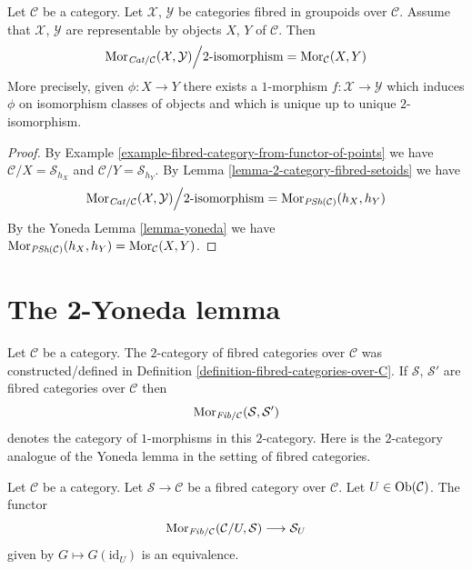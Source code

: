 \begin{lemma}
\label{lemma-morphisms-representable-fibred-categories}
Let $\mathcal{C}$ be a category.
Let $\mathcal{X}$, $\mathcal{Y}$ be categories fibred in groupoids
over $\mathcal{C}$. Assume that $\mathcal{X}$, $\mathcal{Y}$
are representable by objects $X$, $Y$ of $\mathcal{C}$.
Then
$$
\mathop{\mathrm{Mor}}\nolimits_{\textit{Cat}/\mathcal{C}}(\mathcal{X}, \mathcal{Y})
\Big/
2\text{-isomorphism}
=
\mathop{\mathrm{Mor}}\nolimits_\mathcal{C}(X, Y)
$$
More precisely, given $\phi : X \to Y$ there exists a
$1$-morphism $f : \mathcal{X} \to \mathcal{Y}$ which induces
$\phi$ on isomorphism classes of objects and
which is unique up to unique $2$-isomorphism.
\end{lemma}

\begin{proof}
By
Example \ref{example-fibred-category-from-functor-of-points}
we have $\mathcal{C}/X = \mathcal{S}_{h_X}$ and
$\mathcal{C}/Y = \mathcal{S}_{h_Y}$. By
Lemma \ref{lemma-2-category-fibred-setoids}
we have
$$
\mathop{\mathrm{Mor}}\nolimits_{\textit{Cat}/\mathcal{C}}(\mathcal{X}, \mathcal{Y})
\Big/
2\text{-isomorphism}
=
\mathop{\mathrm{Mor}}\nolimits_{\textit{PSh}(\mathcal{C})}(h_X, h_Y)
$$
By the Yoneda
Lemma \ref{lemma-yoneda}
we have $\mathop{\mathrm{Mor}}\nolimits_{\textit{PSh}(\mathcal{C})}(h_X, h_Y)
= \mathop{\mathrm{Mor}}\nolimits_\mathcal{C}(X, Y)$.
\end{proof}









\section{The 2-Yoneda lemma}
\label{section-2-yoneda}

\noindent
Let $\mathcal{C}$ be a category. The $2$-category of fibred categories
over $\mathcal{C}$ was constructed/defined in
Definition \ref{definition-fibred-categories-over-C}.
If $\mathcal{S}$, $\mathcal{S}'$ are fibred categories
over $\mathcal{C}$ then
$$
\mathop{\mathrm{Mor}}\nolimits_{\textit{Fib}/\mathcal{C}}(\mathcal{S}, \mathcal{S}')
$$
denotes the category of $1$-morphisms in this $2$-category.
Here is the $2$-category analogue of the Yoneda lemma
in the setting of fibred categories.

\begin{lemma}
\label{lemma-yoneda-2category-fibred}
Let $\mathcal{C}$ be a category.
Let $\mathcal{S} \to \mathcal{C}$ be a fibred category over $\mathcal{C}$.
Let $U \in \mathop{\mathrm{Ob}}\nolimits(\mathcal{C})$.
The functor
$$
\mathop{\mathrm{Mor}}\nolimits_{\textit{Fib}/\mathcal{C}}(\mathcal{C}/U, \mathcal{S})
\longrightarrow
\mathcal{S}_U
$$
given by $G \mapsto G(\text{id}_U)$ is an equivalence.
\end{lemma}

